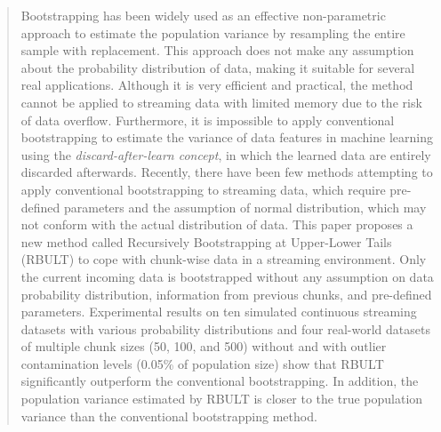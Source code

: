 \documentclass[a4paper,fleqn]{cas-dc}
\begin{document}

\begin{abstract}
Bootstrapping has been widely used as an effective %
non-parametric approach to estimate the population 
variance by resampling the entire sample with replacement. This approach does not make any 
assumption about the probability distribution of data, making it suitable for several real applications. 
Although it is very efficient and practical, the method cannot be applied to streaming data with limited memory due to the risk of data overflow.
Furthermore, it is impossible to apply conventional
bootstrapping to estimate the variance of data features in machine learning using the  
{\em discard-after-learn concept}, in which the learned data are entirely discarded afterwards. Recently, there have been
few methods attempting to apply conventional bootstrapping to streaming data, which require pre-defined 
parameters and the assumption of normal distribution, which may not conform with the actual distribution 
of data. This paper proposes a new method called Recursively Bootstrapping at Upper-Lower Tails (RBULT) 
to cope with chunk-wise data in a streaming environment. Only the current incoming data is bootstrapped 
without any assumption on data probability distribution, information from previous chunks, and pre-defined 
parameters. Experimental results on ten simulated continuous streaming datasets with various probability 
distributions and four real-world datasets of multiple chunk sizes (50, 100, and 500) without and with 
outlier contamination levels (0.05\% of population size) show that RBULT significantly outperform
the conventional bootstrapping. In addition, the population variance
estimated by RBULT is closer to the true population variance than the conventional bootstrapping method. 
\end{abstract}

\end{document}
